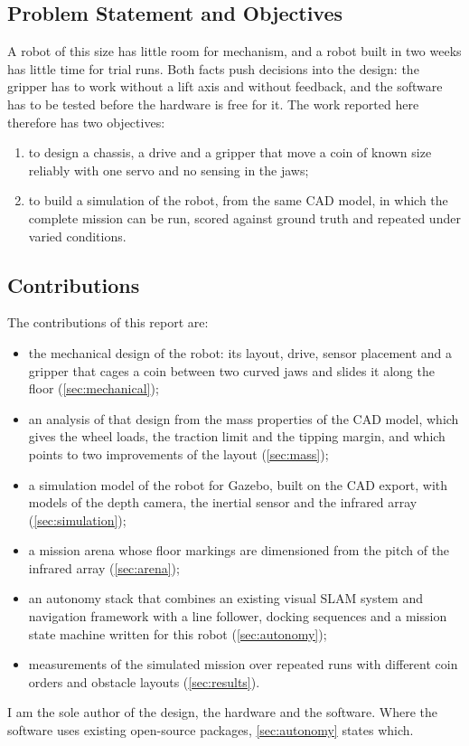 \subsection{Problem Statement and Objectives}
A robot of this size has little room for mechanism, and a robot built in two weeks has
little time for trial runs. Both facts push decisions into the design: the gripper has to
work without a lift axis and without feedback, and the software has to be tested before the
hardware is free for it. The work reported here therefore has two objectives:
\begin{enumerate}
  \item to design a chassis, a drive and a gripper that move a coin of known size reliably
        with one servo and no sensing in the jaws;
  \item to build a simulation of the robot, from the same CAD model, in which the complete
        mission can be run, scored against ground truth and repeated under varied conditions.
\end{enumerate}

\subsection{Contributions}
The contributions of this report are:
\begin{itemize}
  \item the mechanical design of the robot: its layout, drive, sensor placement and a
        gripper that cages a coin between two curved jaws and slides it along the floor
        (\cref{sec:mechanical});
  \item an analysis of that design from the mass properties of the CAD model, which gives
        the wheel loads, the traction limit and the tipping margin, and which points to
        two improvements of the layout (\cref{sec:mass});
  \item a simulation model of the robot for Gazebo, built on the CAD export, with models of
        the depth camera, the inertial sensor and the infrared array
        (\cref{sec:simulation});
  \item a mission arena whose floor markings are dimensioned from the pitch of the infrared
        array (\cref{sec:arena});
  \item an autonomy stack that combines an existing visual SLAM system and navigation
        framework with a line follower, docking sequences and a mission state machine
        written for this robot (\cref{sec:autonomy});
  \item measurements of the simulated mission over repeated runs with different coin
        orders and obstacle layouts (\cref{sec:results}).
\end{itemize}
I am the sole author of the design, the hardware and the software. Where the software uses
existing open-source packages, \cref{sec:autonomy} states which.

